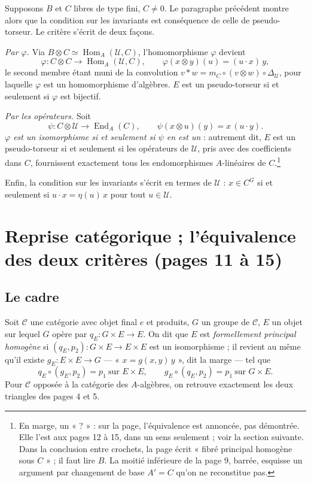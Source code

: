 \documentclass[11pt,a4paper]{article}
\begin{document}
Supposons $B$ et $C$ libres de type fini, $C \neq 0$. Le paragraphe
précédent montre alors que la condition sur les invariants est conséquence de
celle de pseudo-torseur. Le critère s'écrit de deux façons.

\emph{Par $\varphi$.} Via $B \otimes C \simeq \operatorname{Hom}_A(\mathcal{U},
C)$, l'homomorphisme $\varphi$ devient
\[
\varphi \colon C \otimes C \longrightarrow \operatorname{Hom}_A(\mathcal{U}, C),
\qquad \varphi(x \otimes y)(u) = (u \cdot x)\, y ,
\]
le second membre étant muni de la convolution $v * w = m_C \circ (v \otimes
w) \circ \Delta_{\mathcal{U}}$, pour laquelle $\varphi$ est un homomorphisme
d'algèbres. $E$ est un pseudo-torseur si et seulement si $\varphi$ est
bijectif.

\emph{Par les opérateurs.} Soit
\[
\psi \colon C \otimes \mathcal{U} \longrightarrow \operatorname{End}_A(C),
\qquad \psi(x \otimes u)(y) = x\,(u \cdot y).
\]
\emph{$\varphi$ est un isomorphisme si et seulement si $\psi$ en est un} :
autrement dit, $E$ est un pseudo-torseur si et seulement si les opérateurs
de $\mathcal{U}$, pris avec des coefficients dans $C$, fournissent
exactement tous les endomorphismes $A$-linéaires de $C$.\footnote{En marge,
un « ? » : sur la page, l'équivalence est annoncée, pas démontrée. Elle l'est
aux pages 12 à 15, dans un sens seulement ; voir la section suivante. Dans la
conclusion entre crochets, la page écrit « fibré principal homogène sous
$C$ » ; il faut lire $B$. La moitié inférieure de la page 9, barrée, esquisse
un argument par changement de base $A' = C$ qu'on ne reconstitue pas.}

Enfin, la condition sur les invariants s'écrit en termes de $\mathcal{U}$ :
$x \in C^G$ si et seulement si $u \cdot x = \eta(u)\, x$ pour tout
$u \in \mathcal{U}$.

\section*{Reprise catégorique ; l'équivalence des deux critères (pages 11 à 15)}

\subsection*{Le cadre}

Soit $\mathcal{C}$ une catégorie avec objet final $e$ et produits, $G$ un
groupe de $\mathcal{C}$, $E$ un objet sur lequel $G$ opère par
$q_E \colon G \times E \to E$. On dit que $E$ est \emph{formellement
principal homogène} si $(q_E, p_2) \colon G \times E \to E \times E$ est un
isomorphisme ; il revient au même qu'il existe $g_E \colon E \times E \to G$
--- « $x = g(x, y)\, y$ », dit la marge --- tel que
\[
q_E \circ (g_E, p_2) = p_1 \ \text{sur } E \times E,
\qquad
g_E \circ (q_E, p_2) = p_1 \ \text{sur } G \times E .
\]
Pour $\mathcal{C}$ opposée à la catégorie des $A$-algèbres, on retrouve
exactement les deux triangles des pages 4 et 5.
\end{document}
